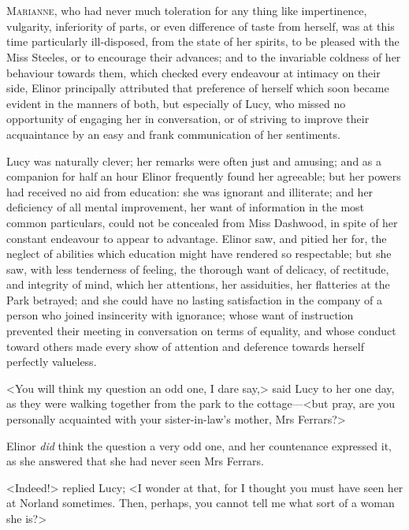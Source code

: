 \chapter[Chapter \thechapter]{}
\lettrine[lraise=0.3]{M}{arianne}, who had never much toleration for any thing like impertinence, vulgarity, inferiority of parts, or even difference of taste from herself, was at this time particularly ill-disposed, from the state of her spirits, to be pleased with the Miss Steeles, or to encourage their advances; and to the invariable coldness of her behaviour towards them, which checked every endeavour at intimacy on their side, Elinor principally attributed that preference of herself which soon became evident in the manners of both, but especially of Lucy, who missed no opportunity of engaging her in conversation, or of striving to improve their acquaintance by an easy and frank communication of her sentiments.

Lucy was naturally clever; her remarks were often just and amusing; and as a companion for half an hour Elinor frequently found her agreeable; but her powers had received no aid from education: she was ignorant and illiterate; and her deficiency of all mental improvement, her want of information in the most common particulars, could not be concealed from Miss Dashwood, in spite of her constant endeavour to appear to advantage. Elinor saw, and pitied her for, the neglect of abilities which education might have rendered so respectable; but she saw, with less tenderness of feeling, the thorough want of delicacy, of rectitude, and integrity of mind, which her attentions, her assiduities, her flatteries at the Park betrayed; and she could have no lasting satisfaction in the company of a person who joined insincerity with ignorance; whose want of instruction prevented their meeting in conversation on terms of equality, and whose conduct toward others made every show of attention and deference towards herself perfectly valueless.

<You will think my question an odd one, I dare say,> said Lucy to her one day, as they were walking together from the park to the cottage—<but pray, are you personally acquainted with your sister-in-law's mother, Mrs Ferrars?>

Elinor \textit{did} think the question a very odd one, and her countenance expressed it, as she answered that she had never seen Mrs Ferrars.

<Indeed!> replied Lucy; <I wonder at that, for I thought you must have seen her at Norland sometimes. Then, perhaps, you cannot tell me what sort of a woman she is?>

